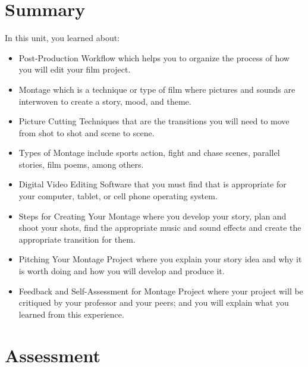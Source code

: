 \documentclass[
]{book}
\providecommand{\tightlist}{%
  \setlength{\itemsep}{0pt}\setlength{\parskip}{0pt}}
\begin{document}
\hypertarget{summary-6}{%
\section*{Summary}\label{summary-6}}

In this unit, you learned about:

\begin{itemize}
\tightlist
\item
  Post-Production Workflow which helps you to organize the process of how you will edit your film project.
\item
  Montage which is a technique or type of film where pictures and sounds are interwoven to create a story, mood, and theme.
\item
  Picture Cutting Techniques that are the transitions you will need to move from shot to shot and scene to scene.
\item
  Types of Montage include sports action, fight and chase scenes, parallel stories, film poems, among others.
\item
  Digital Video Editing Software that you must find that is appropriate for your computer, tablet, or cell phone operating system.
\item
  Steps for Creating Your Montage where you develop your story, plan and shoot your shots, find the appropriate music and sound effects and create the appropriate transition for them.
\item
  Pitching Your Montage Project where you explain your story idea and why it is worth doing and how you will develop and produce it.
\item
  Feedback and Self-Assessment for Montage Project where your project will be critiqued by your professor and your peers; and you will explain what you learned from this experience.
\end{itemize}

\hypertarget{assessment-12}{%
\section*{Assessment}\label{assessment-12}}
\end{document}
